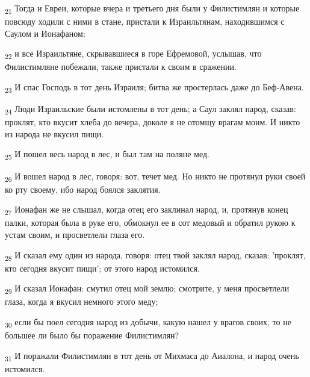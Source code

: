 \begin{tcolorbox}
\textsubscript{21} Тогда и Евреи, которые вчера и третьего дня были у Филистимлян и которые повсюду ходили с ними в стане, пристали к Израильтянам, находившимся с Саулом и Ионафаном;
\end{tcolorbox}
\begin{tcolorbox}
\textsubscript{22} и все Израильтяне, скрывавшиеся в горе Ефремовой, услышав, что Филистимляне побежали, также пристали к своим в сражении.
\end{tcolorbox}
\begin{tcolorbox}
\textsubscript{23} И спас Господь в тот день Израиля; битва же простерлась даже до Беф-Авена.
\end{tcolorbox}
\begin{tcolorbox}
\textsubscript{24} Люди Израильские были истомлены в тот день; а Саул заклял народ, сказав: проклят, кто вкусит хлеба до вечера, доколе я не отомщу врагам моим. И никто из народа не вкусил пищи.
\end{tcolorbox}
\begin{tcolorbox}
\textsubscript{25} И пошел весь народ в лес, и был там на поляне мед.
\end{tcolorbox}
\begin{tcolorbox}
\textsubscript{26} И вошел народ в лес, говоря: вот, течет мед. Но никто не протянул руки своей ко рту своему, ибо народ боялся заклятия.
\end{tcolorbox}
\begin{tcolorbox}
\textsubscript{27} Ионафан же не слышал, когда отец его заклинал народ, и, протянув конец палки, которая была в руке его, обмокнул ее в сот медовый и обратил рукою к устам своим, и просветлели глаза его.
\end{tcolorbox}
\begin{tcolorbox}
\textsubscript{28} И сказал ему один из народа, говоря: отец твой заклял народ, сказав: 'проклят, кто сегодня вкусит пищи'; от этого народ истомился.
\end{tcolorbox}
\begin{tcolorbox}
\textsubscript{29} И сказал Ионафан: смутил отец мой землю; смотрите, у меня просветлели глаза, когда я вкусил немного этого меду;
\end{tcolorbox}
\begin{tcolorbox}
\textsubscript{30} если бы поел сегодня народ из добычи, какую нашел у врагов своих, то не большее ли было бы поражение Филистимлян?
\end{tcolorbox}
\begin{tcolorbox}
\textsubscript{31} И поражали Филистимлян в тот день от Михмаса до Аиалона, и народ очень истомился.
\end{tcolorbox}
